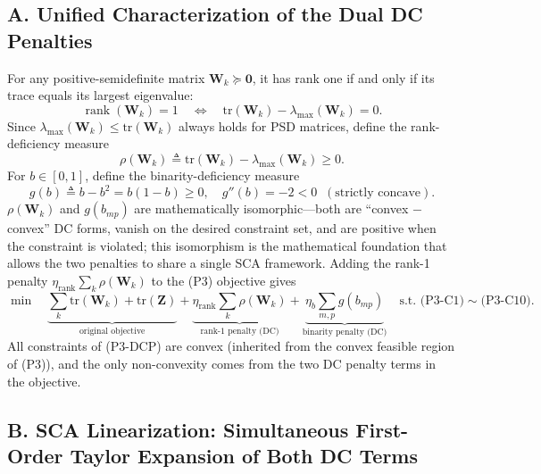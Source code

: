 \documentclass[12pt,a4paper]{article}
\newcommand{\mat}[1]{\mathbf{#1}}
\newcommand{\tr}{\text{tr}}
\DeclareMathOperator{\rank}{rank}
\begin{document}
\subsection*{A. Unified Characterization of the Dual DC Penalties}

For any positive-semidefinite matrix $\mat{W}_k \succeq \mat{0}$, it has rank one if and only if its trace equals its largest eigenvalue:
\begin{equation}\label{eq:rank1-equivalence}
\rank(\mat{W}_k) = 1 \quad \Longleftrightarrow \quad \tr(\mat{W}_k) - \lambda_{\max}(\mat{W}_k) = 0.
\end{equation}
Since $\lambda_{\max}(\mat{W}_k) \leq \tr(\mat{W}_k)$ always holds for PSD matrices, define the rank-deficiency measure
\begin{equation}\label{eq:rho-def}
\rho(\mat{W}_k) \triangleq \tr(\mat{W}_k) - \lambda_{\max}(\mat{W}_k) \geq 0.
\end{equation}
For $b \in [0,1]$, define the binarity-deficiency measure
\begin{equation}\label{eq:g-def}
g(b) \triangleq b - b^2 = b(1-b) \geq 0, \quad g''(b) = -2 < 0 \;\; (\text{strictly concave}).
\end{equation}
$\rho(\mat{W}_k)$ and $g(b_{mp})$ are mathematically isomorphic---both are ``convex $-$ convex'' DC forms, vanish on the desired constraint set, and are positive when the constraint is violated; this isomorphism is the mathematical foundation that allows the two penalties to share a single SCA framework. Adding the rank-1 penalty $\eta_{\text{rank}} \sum_k \rho(\mat{W}_k)$ to the (P3) objective gives
\begin{equation}\label{eq:p3-dcp}
\min \quad \underbrace{\sum_k \tr(\mat{W}_k) + \tr(\mat{Z})}_{\text{original objective}} + \underbrace{\eta_{\text{rank}} \sum_k \rho(\mat{W}_k)}_{\text{rank-1 penalty (DC)}} + \underbrace{\eta_b \sum_{m,p} g(b_{mp})}_{\text{binarity penalty (DC)}} \quad \text{s.t. (P3-C1)} \sim \text{(P3-C10)}.
\end{equation}
All constraints of (P3-DCP) are convex (inherited from the convex feasible region of (P3)), and the only non-convexity comes from the two DC penalty terms in the objective.

\subsection*{B. SCA Linearization: Simultaneous First-Order Taylor Expansion of Both DC Terms}
\end{document}
